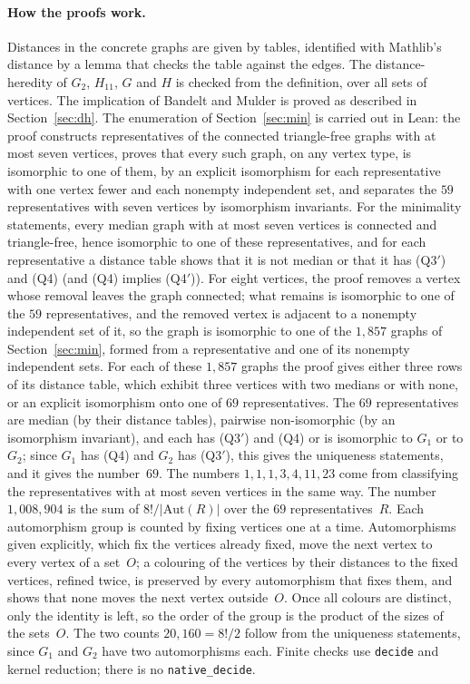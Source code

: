 \documentclass[11pt]{article}
\theoremstyle{remark}
\newcommand{\QAp}{\textup{(Q3$'$)}}
\newcommand{\QB}{\textup{(Q4)}}
\newcommand{\QBp}{\textup{(Q4$'$)}}
\begin{document}
\paragraph{How the proofs work.}
Distances in the concrete graphs are given by tables, identified with
Mathlib's distance by a lemma that checks the table against the edges. The
distance-heredity of $G_2$, $H_{11}$, $G$ and $H$ is checked from the
definition, over all sets of vertices. The implication of Bandelt and
Mulder is proved as described in Section~\ref{sec:dh}. The enumeration of
Section~\ref{sec:min} is carried out in Lean: the proof constructs
representatives of the connected triangle-free graphs with at most seven
vertices, proves that every such graph, on any vertex type, is isomorphic to
one of them, by an explicit isomorphism for each representative with one
vertex fewer and each nonempty independent set, and separates the $59$
representatives with seven vertices by isomorphism invariants.
For the minimality statements, every median graph with at most seven
vertices is connected and triangle-free, hence isomorphic to one of these
representatives, and for each representative a distance table shows that it
is not median or that it has \QAp{} and \QB{} (and \QB{} implies \QBp).
For eight vertices, the
proof removes a vertex whose removal leaves the graph connected; what
remains is isomorphic to one of the $59$ representatives, and the removed
vertex is adjacent to a nonempty independent set of it, so the graph is
isomorphic to one of the $1{,}857$ graphs of Section~\ref{sec:min}, formed
from a representative and one of its nonempty independent sets. For
each of these $1{,}857$ graphs the proof gives either three rows of its
distance table, which exhibit three vertices with two medians or with none,
or an explicit isomorphism onto one of $69$ representatives. The $69$
representatives are median (by their distance tables), pairwise
non-isomorphic (by an isomorphism invariant), and each has \QAp{} and \QB{}
or is isomorphic to $G_1$ or to $G_2$; since $G_1$ has \QB{} and $G_2$ has
\QAp, this gives the uniqueness statements, and it gives the number~$69$.
The numbers $1,1,1,3,4,11,23$ come from classifying the representatives
with at most seven vertices in the same way. The number
$1{,}008{,}904$ is the sum of $8!/|\mathrm{Aut}(R)|$ over the $69$
representatives~$R$. Each automorphism group is counted by fixing vertices
one at a time. Automorphisms given explicitly, which fix the vertices
already fixed, move the next vertex to every vertex of a set~$O$; a
colouring of the vertices by their distances to the fixed vertices, refined
twice, is preserved by every automorphism that fixes them, and shows that
none moves the next vertex outside~$O$. Once all colours are distinct, only
the identity is left, so the order of the group is the product of the sizes
of the sets~$O$. The two counts
$20{,}160=8!/2$ follow from the uniqueness statements, since $G_1$ and $G_2$
have two automorphisms each.
Finite checks use \texttt{decide} and kernel reduction; there is no
\texttt{native\_decide}.
\end{document}
